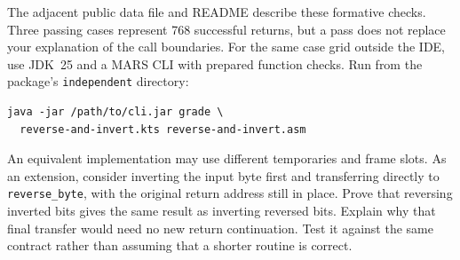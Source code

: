 The adjacent public data file and README describe these formative checks. Three
passing cases represent 768 successful returns, but a pass does not replace your
explanation of the call boundaries. For the same case grid outside the IDE, use
JDK~25 and a MARS CLI with prepared function checks. Run from the package's
\texttt{independent} directory:

\begin{verbatim}
java -jar /path/to/cli.jar grade \
  reverse-and-invert.kts reverse-and-invert.asm
\end{verbatim}

An equivalent implementation may use different temporaries and frame slots. As an
extension, consider inverting the input byte first and transferring directly to
\texttt{reverse\_byte}, with the original return address still in place. Prove
that reversing inverted bits gives the same result as inverting reversed bits.
Explain why that final transfer would need no new return continuation. Test it
against the same contract rather than assuming that a shorter routine is correct.
